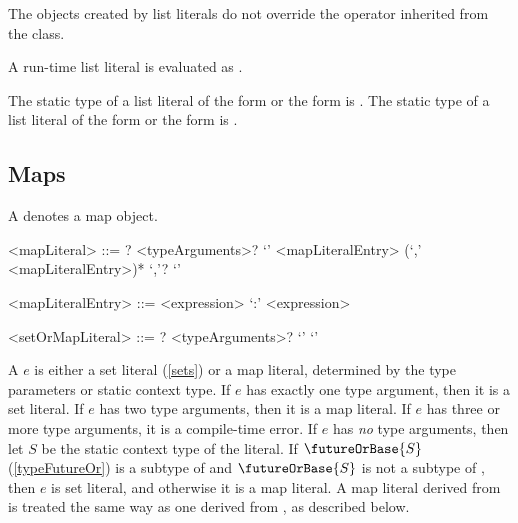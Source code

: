 \documentclass[makeidx]{article}
\begin{document}
{\LMHash{}%
The objects created by list literals do not override
the \lit{==} operator inherited from the  class.


\LMHash{}%
A run-time list literal
\code{[$e_1, \ldots, e_n$]}
is evaluated as
\code{<\DYNAMIC>[$e_1, \ldots, e_n$]}.


\LMHash{}%
The static type of a list literal of the form
or the form
is .
%
The static type of a list literal of the form
\code{\CONST\,\,[$e_1, \ldots, e_n$]}
or the form
\code{[$e_1, \ldots, e_n$]}
is .


\subsection{Maps}

\LMHash{}%
A  denotes a map object.

\begin{grammar}
<mapLiteral> ::= \CONST{}? <typeArguments>?
  \gnewline{} `{' <mapLiteralEntry> (`,' <mapLiteralEntry>)* `,'? `}'

<mapLiteralEntry> ::= <expression> `:' <expression>

<setOrMapLiteral> ::= \CONST{}? <typeArguments>? `{' `}'
\end{grammar}

\LMHash{}%
A  $e$ is either a set literal (\ref {sets}) or a map literal,
determined by the type parameters or static context type.
If $e$ has exactly one type argument, then it is a set literal.
If $e$ has two type arguments, then it is a map literal.
If $e$ has three or more type arguments, it is a compile-time error.
If $e$ has \emph{no} type arguments,
then let $S$ be the static context type of the literal.
If $\futureOrBase{S}$ (\ref{typeFutureOr}) is a subtype of 
and $\futureOrBase{S}$ is not a subtype of ,
then $e$ is set literal,
and otherwise it is a map literal.
A map literal derived from 
is treated the same way as one derived from ,
as described below.

}
\end{document}
